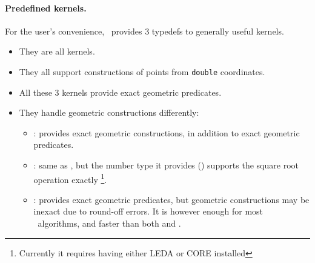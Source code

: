 \paragraph{Predefined kernels.}
For the user's convenience, \cgal\ provides 3 typedefs to generally useful
kernels.

\begin{itemize}
\item They are all  kernels.
\item They all support constructions of points from \texttt{double} 
      coordinates.
\item All these 3 kernels provide exact geometric predicates.
\item They handle geometric constructions differently:
  \begin{itemize}
  \item {}: provides exact
        geometric constructions, in addition to exact geometric predicates.
  \item {}:
        same as , but the
        number type it provides
        ()
        supports the square root operation exactly
        \footnote{Currently it requires having either LEDA or CORE installed}.
  \item {}: provides exact
        geometric predicates, but geometric constructions may be inexact due to
        round-off errors.  It is however enough for most \cgal\ algorithms, and
        faster than both  and
        .
  \end{itemize}
\end{itemize}

